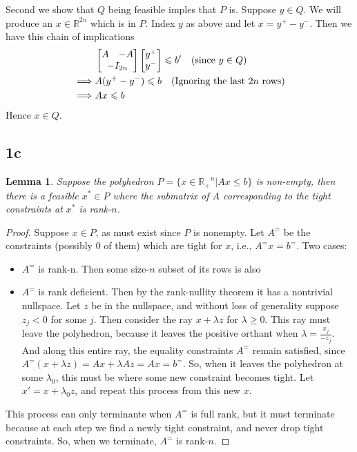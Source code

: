 \documentclass{article}
\newtheorem{lemma}{Lemma}
\begin{document}
Second we show that $Q$ being feasible imples that $P$ is. Suppose $y\in Q$. We will produce an $x \in \mathbb{R}^{2n}$ which is in $P$. Index $y$ as above and let $x = y^+ - y^-$. Then we have this chain of implications
\begin{align*}
&\begin{bmatrix} A & -A \\ \multicolumn{2}{c}{-I_{2n}} \end{bmatrix} \begin{bmatrix} y^+ \\ y^- \end{bmatrix} \leqslant b' \quad \text{(since $y \in Q$)}\\
\implies & A(y^+ - y^-) \leqslant b \quad \text{(Ignoring the last $2n$ rows)}\\
\implies & Ax \leqslant b
\end{align*}
Hence $x \in Q$.

\subsection*{1c}

\begin{lemma}
  Suppose the polyhedron $P = \{x \in \mathbb{R_+}^n | Ax \leq b\}$ is
non-empty, then there is a feasible $x^* \in P$ where the submatrix of $A$ corresponding to the tight constraints at $x^*$ is rank-$n$.
\end{lemma}
\begin{proof}
Suppose $x \in P$, as must exist since $P$ is nonempty. Let $A^=$ be the constraints (possibly 0 of them) which are tight for $x$, i.e., $A^=x = b^=$. Two cases:

\begin{itemize}
\item $A^=$ is rank-n. Then some size-$n$ subset of its rows is also 
\item $A^=$ is rank deficient. Then by the rank-nullity theorem it has a
nontrivial nullspace. Let $z$ be in the nullspace, and without loss of
generality suppose $z_j < 0$ for some $j$. Then consider the ray $x + \lambda
z$ for $\lambda \geq 0$. This ray must leave the polyhedron, because it leaves
the positive orthant when $\lambda = \frac{x_j}{-z_j}$. And along this entire
ray, the equality constraints $A^=$ remain satisfied, since $A^=(x + \lambda
z) = Ax + \lambda Az = Ax = b^=$. So, when it leaves the polyhedron at some
$\lambda_0$, this must be where some new constraint becomes tight. Let $x' = x
+ \lambda_0 z$, and repeat this process from this new $x$.
\end{itemize}

This process can only terminante when $A^=$ is full rank, but it must terminate
because at each step we find a newly tight constraint, and never drop tight
constraints. So, when we terminate, $A^=$ is rank-$n$.
 
\end{proof}
\end{document}
